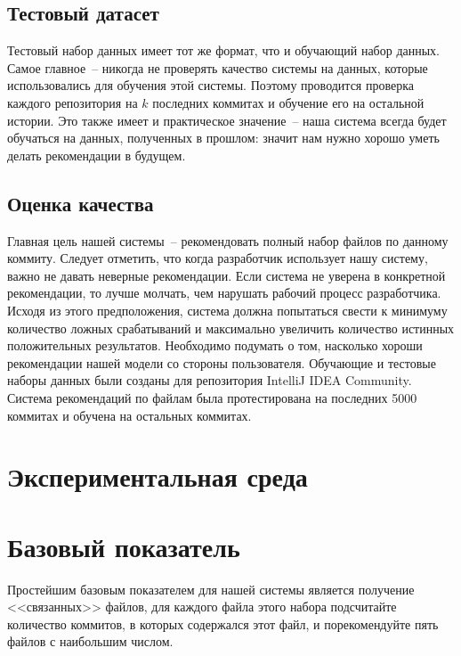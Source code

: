 \subsection{Тестовый датасет}
Тестовый набор данных имеет тот же формат, что и обучающий набор данных. Самое главное~-- никогда не проверять качество системы на данных, которые использовались для обучения этой системы. Поэтому проводится проверка каждого репозитория на $k$ последних коммитах и обучение его на остальной истории. Это также имеет и практическое значение~-- наша система всегда будет обучаться на данных, полученных в прошлом: значит нам нужно хорошо уметь делать рекомендации в будущем.
\subsection{Оценка качества}
Главная цель нашей системы~-- рекомендовать полный набор файлов по данному коммиту. Следует отметить, что когда разработчик использует нашу систему, важно не давать неверные рекомендации. Если система не уверена в конкретной рекомендации, то лучше молчать, чем нарушать рабочий процесс разработчика. Исходя из этого предположения, система должна попытаться свести к минимуму количество ложных срабатываний и максимально увеличить количество истинных положительных результатов. Необходимо подумать о том, насколько хороши рекомендации нашей модели со стороны пользователя. Обучающие и тестовые наборы данных были созданы для репозитория IntelliJ IDEA Community. Система рекомендаций по файлам была протестирована на последних 5000 коммитах и обучена на остальных коммитах.
\section{Экспериментальная среда}
\section{Базовый показатель}\label{baseline}
Простейшим базовым показателем для нашей системы является получение <<связанных>> файлов, для каждого файла этого набора подсчитайте количество коммитов, в которых содержался этот файл, и порекомендуйте пять файлов с наибольшим числом. %
